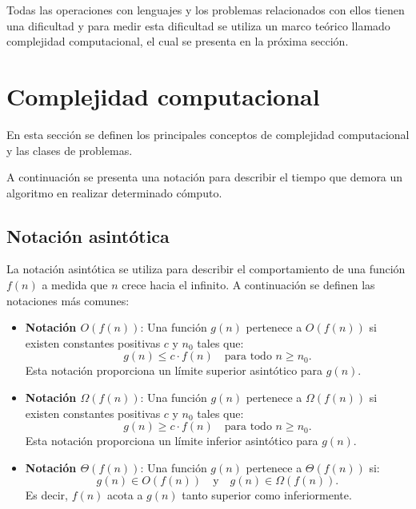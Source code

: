 Todas las operaciones con lenguajes y los problemas relacionados con ellos tienen una dificultad y para medir esta dificultad
se utiliza un marco teórico llamado complejidad computacional, el cual se presenta en la próxima sección.

\section{Complejidad computacional}

En esta sección se definen los principales conceptos de complejidad computacional y las clases de problemas.

A continuación se presenta una notación para describir el tiempo que demora un algoritmo en realizar determinado cómputo.

\subsection{Notación asintótica}

La notación asintótica se utiliza para describir el comportamiento de una función $f(n)$ a medida que $n$ crece hacia el infinito. A continuación se definen las notaciones más comunes:

\begin{itemize}
      \item \textbf{Notación $O(f(n))$}: Una función $g(n)$ pertenece a $O(f(n))$ si existen constantes positivas $c$ y $n_0$ tales que:
            \[
                  g(n) \leq c \cdot f(n) \quad \text{para todo } n \geq n_0.
            \]
            Esta notación proporciona un límite superior asintótico para $g(n)$.
            
      \item \textbf{Notación $\Omega(f(n))$}: Una función $g(n)$ pertenece a $\Omega(f(n))$ si existen constantes positivas $c$ y $n_0$ tales que:
            \[
                  g(n) \geq c \cdot f(n) \quad \text{para todo } n \geq n_0.
            \]
            Esta notación proporciona un límite inferior asintótico para $g(n)$.
            
      \item \textbf{Notación $\Theta(f(n))$}: Una función $g(n)$ pertenece a $\Theta(f(n))$ si:
            \[
                  g(n) \in O(f(n)) \quad \text{y} \quad g(n) \in \Omega(f(n)).
            \]
            Es decir, $f(n)$ acota a $g(n)$ tanto superior como inferiormente.
\end{itemize}

